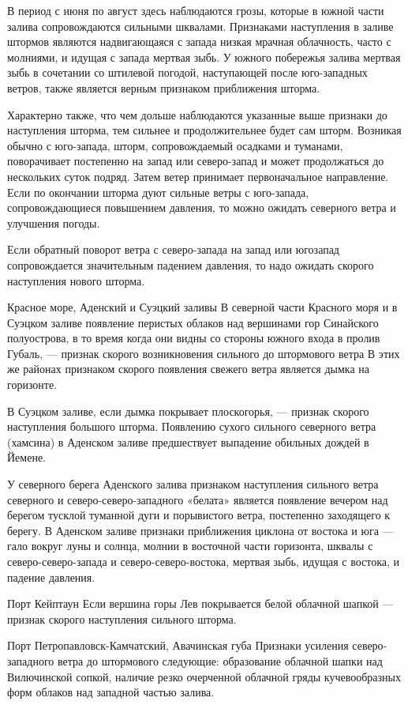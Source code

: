 В период с июня по август здесь наблюдаются грозы, которые в южной части залива сопровождаются сильными шквалами. Признаками наступления в заливе штормов являются надвигающаяся с запада низкая мрачная облачность, часто с молниями, и идущая с запада мертвая зыбь. У южного побережья залива мертвая зыбь в сочетании со штилевой погодой, наступающей после юго-западных ветров, также является верным признаком приближения шторма.

Характерно также, что чем дольше наблюдаются указанные выше признаки до наступления шторма, тем сильнее и продолжительнее будет сам шторм. Возникая обычно с юго-запада, шторм, сопровождаемый осадками и туманами, поворачивает постепенно на запад или северо-запад и может продолжаться до нескольких суток подряд. Затем ветер принимает первоначальное направление. Если по окончании шторма дуют сильные ветры с юго-запада, сопровождающиеся повышением давления, то можно ожидать северного ветра и улучшения погоды.

Если обратный поворот ветра с северо-запада на запад или югозапад сопровождается значительным падением давления, то надо ожидать скорого наступления нового шторма.

Красное море, Аденский и Суэцкий заливы
В северной части Красного моря и в Суэцком заливе появление перистых облаков над вершинами гор Синайского полуострова, в то время когда они видны со стороны южного входа в пролив Губаль, — признак скорого возникновения сильного до штормового ветра В этих же районах признаком скорого появления свежего ветра является дымка на горизонте.

В Суэцком заливе, если дымка покрывает плоскогорья, — признак скорого наступления большого шторма. Появлению сухого сильного северного ветра (хамсина) в Аденском заливе предшествует выпадение обильных дождей в Йемене.

У северного берега Аденского залива признаком наступления сильного ветра северного и северо-северо-западного «белата» является появление вечером над берегом тусклой туманной дуги и порывистого ветра, постепенно заходящего к берегу. В Аденском заливе признаки приближения циклона от востока и юга — гало вокруг луны и солнца, молнии в восточной части горизонта, шквалы с северо-северо-запада и северо-северо-востока, мертвая зыбь, идущая с востока, и падение давления.

Порт Кейптаун
Если вершина горы Лев покрывается белой облачной шапкой — признак скорого наступления сильного шторма.

Порт Петропавловск-Камчатский, Авачинская губа
Признаки усиления северо-западного ветра до штормового следующие: образование облачной шапки над Вилючинской сопкой, наличие резко очерченной облачной гряды кучевообразных форм облаков над западной частью залива.

